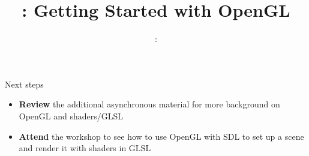 \usepackage{../../beamerthemeFalmouthGamesAcademy}
\usepackage{multimedia}
\graphicspath{ {../../} }




\usepackage[normalem]{ulem}
\usepackage{wasysym}

\usepackage{pdfpages}

\usetikzlibrary{arrows,automata}




\title{\sessionnumber: Getting Started with OpenGL}
\subtitle{\modulecode: \moduletitle}

\frame{\titlepage} 






\begin{frame}{Next steps}
	\begin{itemize}
		\item \textbf{Review} the additional asynchronous material for more background on OpenGL and shaders/GLSL
		\item \textbf{Attend} the workshop to see how to use OpenGL with SDL to set up a scene and render it with shaders in GLSL
	\end{itemize}
\end{frame}



